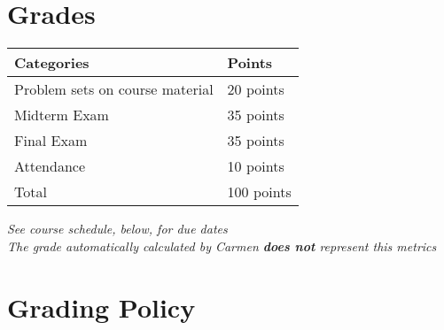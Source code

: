 \documentclass[12pt]{article}
\begin{document}
\newpage

\section*{Grades}

\newlength\q
\setlength{}
\begin{tabular}{|p{\q}|p{\q}|}
    \hline
    Categories  & Points \\
    \hline
    \hline
    Problem sets on course material   & 20 points \\
    \hline
    Midterm Exam & 35 points \\
    \hline
    Final Exam & 35 points \\
    \hline
    Attendance & 10 points \\
    \hline
    Total & 100 points \\
    \hline
\end{tabular}
\textit{See course schedule, below, for due dates} \\
\textit{The grade automatically calculated by Carmen \textbf{does not} represent this metrics}


\section*{Grading Policy}




\end{document}
